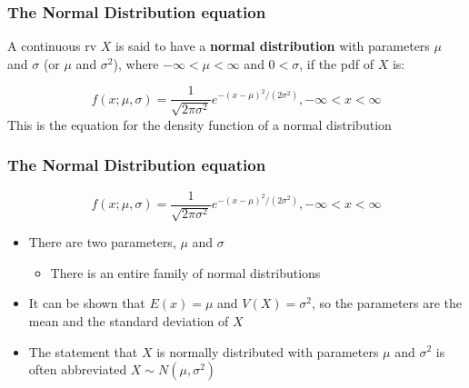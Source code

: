 \documentclass[12pt, block=fill]{beamer}
\begin{document}
\begin{frame}
  \frametitle{The Normal Distribution equation}
  A continuous rv $X$ is said to have a \textbf{normal distribution} with parameters $\mu$ and $\sigma$ (or $\mu$ and $\sigma^{2}$), where $-\infty < \mu < \infty$ and $ 0 < \sigma$, if the pdf of $X$ is:
  
  \begin{equation}
     f(x; \mu, \sigma) = \frac{1}{\sqrt{2\pi\sigma^{2}}}
     e^{-(x-\mu)^{2}/(2\sigma^{2})},
     -\infty < x < \infty
  \end{equation}
  This is the equation for the density function of a normal distribution
\end{frame}

\begin{frame}
  \frametitle{The Normal Distribution equation}
  
  \begin{equation}
     f(x; \mu, \sigma) = \frac{1}{\sqrt{2\pi\sigma^{2}}}
     e^{-(x-\mu)^{2}/(2\sigma^{2})},
     -\infty < x < \infty
  \end{equation}
  
  \begin{itemize}
    \item There are two parameters, $\mu$ and $\sigma$
    \begin{itemize}
      \item There is an entire family of normal distributions
    \end{itemize}
    \item It can be shown that $E(x)=\mu$ and $V(X)=\sigma^{2}$, so the parameters are the mean and the standard deviation of $X$
    \item The statement that $X$ is normally distributed with parameters $\mu$ and $\sigma^{2}$ is often abbreviated $X \sim N(\mu, \sigma^{2})$
  \end{itemize}
\end{frame}
\end{document}

